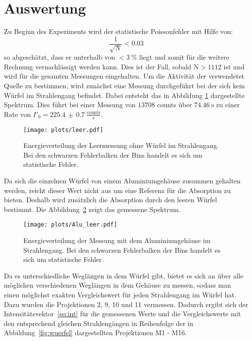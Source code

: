 \section{Auswertung}
Zu Beginn des Experiments wird der statistische Poissonfehler mit Hilfe von:
\begin{equation*}
  \frac{1}{\sqrt{N}} < 0.03
\end{equation*}
so abgeschätzt, dass er unterhalb von $<\SI{3}{\percent}$ liegt und somit für die weitere
Rechnung vernachlässigt werden kann. Dies ist der Fall, sobald $\text{N}>1112$
ist und wird für die gesamten Messungen eingehalten. Um die Aktivität der verwendetet Quelle zu bestimmen, wird zunächst eine Messung durchgeführt bei der sich kein Würfel im Strahlengang befindet. Dabei entsteht das in Abbildung \ref{fig:leer} dargestellte Spektrum. Dies führt bei einer Messung von $13708$ counts über $\SI{74.46}{\second}$ zu einer Rate von $I'_0 = 225.4\,\pm\,0.7\:\frac{\text{counts}}{\text{s}}$.

\begin{figure}
  \centering
  \texttt{[image: plots/leer.pdf]}
  \caption{Energieverteilung der Leermessung ohne Würfel im Strahlengang. Bei den schwarzen Fehlerbalken der Bins handelt es sich um statistische Fehler.}
  \label{fig:leer}
\end{figure}

Da sich die einzelnen Würfel von einem Aluminiumgehäuse zusammen gehalten werden, reicht dieser Wert nicht aus um eine Referenz für die Absorption zu bieten. Deshalb wird zusätzlich die Absorption durch den leeren Würfel bestimmt.
Die Abbildung~\ref{fig:alu} zeigt das gemessene Spektrum.

\begin{figure}
  \centering
  \texttt{[image: plots/Alu\_leer.pdf]}
  \caption{Energieverteilung der Messung mit dem Aluminiumgehäuse im Strahlengang. Bei den schwarzen Fehlerbalken der Bins handelt es sich um statistische Fehler.}
  \label{fig:alu}
\end{figure}

Da es unterschiedliche Weglängen in dem Würfel gibt, bietet es sich an über alle möglichen verschiedenen Weglängen in dem Gehäuse zu messen, sodass man einen möglichst exakten Vergleichswert für jeden Strahlengang im Würfel hat. Dazu wurden die Projektionen 2, 9, 10 und 11 vermessen. Dadurch ergibt sich der Intensitätsvektor~\ref{eq:int} für die gemessenen Werte und die Vergleichswerte mit den entsprechend gleichen Strahlengängen in Reihenfolge der in Abbildung~\ref{fig:wuerfel} dargestellten Projektionen M1 - M16.

